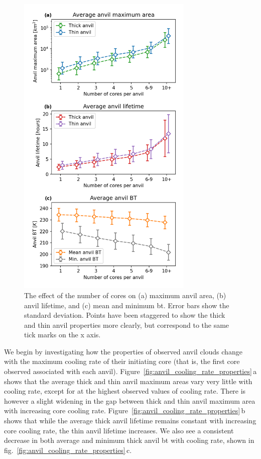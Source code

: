 \begin{figure}[tp]
    \centering
    \includegraphics[width=0.75\textwidth]{figures/chapter3_05.png}
    \caption[
    The effect of the number of cores on maximum anvil area, anvil lifetime, and mean and minimum \acrshort{bt}
    ]{
    The effect of the number of cores on (a) maximum anvil area, (b) anvil lifetime, and (c) mean and minimum \acrshort{bt}. Error bars show the standard deviation. Points have been staggered to show the thick and thin anvil properties more clearly, but correspond to the same tick marks on the x axis.
    }
    \label{fig:anvil_number_of_cores_properties}
\end{figure}

We begin by investigating how the properties of observed anvil clouds change with the maximum cooling rate of their initiating core (that is, the first core observed associated with each anvil).
Figure~\ref{fig:anvil_cooling_rate_properties}\,a shows that the average thick and thin anvil maximum areas vary very little with cooling rate, except for at the highest observed values of cooling rate.
There is however a slight widening in the gap between thick and thin anvil maximum area with increasing core cooling rate.
Figure~\ref{fig:anvil_cooling_rate_properties}\,b shows that while the average thick anvil lifetime remains constant with increasing core cooling rate, the thin anvil lifetime increases.
We also see a consistent decrease in both average and minimum thick anvil \acrshort{bt} with cooling rate, shown in fig.~\ref{fig:anvil_cooling_rate_properties}\,c.


